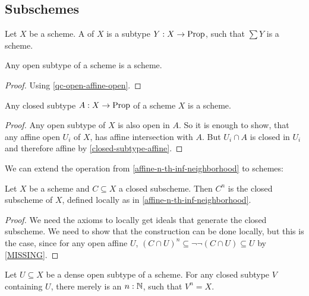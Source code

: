 \subsection{Subschemes}

\begin{definition}
  Let $X$ be a scheme.
  A  of $X$ is a subtype $Y:X\to\mathrm{Prop}$,
  such that $\sum Y$ is a scheme.
\end{definition}

\begin{proposition}%
  \label{open-subscheme}
  Any open subtype of a scheme is a scheme.
\end{proposition}

\begin{proof}
  Using \cref{qc-open-affine-open}.
\end{proof}

\begin{proposition}%
  \label{closed-subscheme}
  Any closed subtype $A:X\to \mathrm{Prop}$ of a scheme $X$ is a scheme.
\end{proposition}

\begin{proof}
  Any open subtype of $X$ is also open in $A$.
  So it is enough to show,
  that any affine open $U_i$ of $X$,
  has affine intersection with $A$.
  But $U_i\cap A$ is closed in $U_i$ and therefore affine by \cref{closed-subtype-affine}.
\end{proof}

We can extend the operation from \cref{affine-n-th-inf-neighborhood}
to schemes:

\begin{definition}%
  Let $X$ be a scheme and $C\subseteq X$ a closed subscheme.
  Then $C^n$ is the closed subscheme of $X$,
  defined locally as in \cref{affine-n-th-inf-neighborhood}.
\end{definition}

\begin{proof}
  We need the axioms to locally get ideals that generate the closed subscheme.
  We need to show that the construction can be done locally,
  but this is the case, since for any open affine $U$,
  $(C\cap U)^n\subseteq \neg\neg (C\cap U)\subseteq U$ by \cref{MISSING}.
\end{proof}

\begin{lemma}%
  \label{dense-closed-n-th-neighborhood}
  Let $U\subseteq X$ be a dense open subtype of a scheme.
  For any closed subtype $V$ containing $U$,
  there merely is an $n:\mathbb{N}$, such that $V^n=X$.
\end{lemma}

